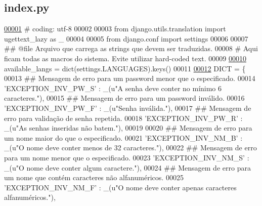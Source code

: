\hypertarget{index_8py_source}{}\subsection{index.\+py}
\label{index_8py_source}

\begin{DoxyCode}
\hypertarget{index_8py_source_l00001}{}\hyperlink{namespaceELO_1_1index}{00001} \textcolor{comment}{# coding: utf-8}
00002 
00003 \textcolor{keyword}{from} django.utils.translation \textcolor{keyword}{import} ugettext\_lazy \textcolor{keyword}{as} \_
00004 
00005 \textcolor{keyword}{from} django.conf \textcolor{keyword}{import} settings
00006 
00007 \textcolor{comment}{## @file Arquivo que carrega as strings que devem ser traduzidas.}
00008 \textcolor{comment}{#   Aqui ficam todas as macros do sistema. Evite utilizar hard-coded text.}
00009 
\hypertarget{index_8py_source_l00010}{}\hyperlink{namespaceELO_1_1index_aae899027d156c2d530d8eaead5e0a990}{00010} available\_langs = dict(settings.LANGUAGES).keys()
00011 
\hypertarget{index_8py_source_l00012}{}\hyperlink{namespaceELO_1_1index_ada538ef183be3fce6bc34d0714e4e8cb}{00012} DICT = \{
00013     \textcolor{comment}{## Mensagem de erro para um password menor que o especificado.}
00014     \textcolor{stringliteral}{'EXCEPTION\_INV\_PW\_S'} : \_(\textcolor{stringliteral}{u"A senha deve conter no mínimo 6 caracteres."}),
00015     \textcolor{comment}{## Mensagem de erro para um password inválido.}
00016     \textcolor{stringliteral}{'EXCEPTION\_INV\_PW\_F'} : \_(\textcolor{stringliteral}{u"Senha inválida."}),
00017     \textcolor{comment}{## Mensagem de erro para validação de senha repetida.}
00018     \textcolor{stringliteral}{'EXCEPTION\_INV\_PW\_R'} : \_(\textcolor{stringliteral}{u"As senhas inseridas não batem."}),
00019 
00020     \textcolor{comment}{## Mensagem de erro para um nome maior do que o especificado.}
00021     \textcolor{stringliteral}{'EXCEPTION\_INV\_NM\_B'} : \_(\textcolor{stringliteral}{u"O nome deve conter menos de 32 caracteres."}),
00022     \textcolor{comment}{## Mensagem de erro para um nome menor que o especificado.}
00023     \textcolor{stringliteral}{'EXCEPTION\_INV\_NM\_S'} : \_(\textcolor{stringliteral}{u"O nome deve conter algum caractere."}),
00024     \textcolor{comment}{## Mensagem de erro para um nome que contém caracteres não alfanuméricos.}
00025     \textcolor{stringliteral}{'EXCEPTION\_INV\_NM\_F'} : \_(\textcolor{stringliteral}{u"O nome deve conter apenas caracteres alfanuméricos."}),

\end{DoxyCode}
